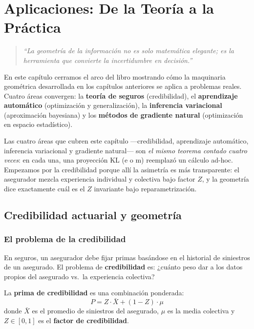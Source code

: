 
\chapter{Aplicaciones: De la Teoría a la Práctica}

\begin{quotation}
	\itshape
	``La geometría de la información no es solo matemática elegante; es la herramienta que convierte la incertidumbre en decisión.''
\end{quotation}

En este capítulo cerramos el arco del libro mostrando cómo la maquinaria geométrica desarrollada en los capítulos anteriores se aplica a problemas reales.  Cuatro áreas convergen: la \textbf{teoría de seguros} (credibilidad), el \textbf{aprendizaje automático} (optimización y generalización), la \textbf{inferencia variacional} (aproximación bayesiana) y los \textbf{métodos de gradiente natural} (optimización en espacio estadístico).

\bigskip
\noindent
Las cuatro áreas que cubren este capítulo ---credibilidad, aprendizaje automático, inferencia variacional y gradiente natural--- son \emph{el mismo teorema contado cuatro veces}: en cada una, una proyección KL (e o m) reemplazó un cálculo ad-hoc. Empezamos por la credibilidad porque allí la asimetría es más transparente: el asegurador mezcla experiencia individual y colectiva bajo factor $Z$, y la geometría dice exactamente cuál es el $Z$ invariante bajo reparametrización.

\section{Credibilidad actuarial y geometría}

\subsection{El problema de la credibilidad}

En seguros, un asegurador debe fijar primas basándose en el historial de siniestros de un asegurado.  El problema de \textbf{credibilidad} es: ¿cuánto peso dar a los datos propios del asegurado vs.\ la experiencia colectiva?

\begin{definition}
	La \textbf{prima de credibilidad} es una combinación ponderada:
	\[
	P = Z \cdot \bar{X} + (1-Z) \cdot \mu
	\]
	donde $\bar{X}$ es el promedio de siniestros del asegurado, $\mu$ es la media colectiva y $Z \in [0,1]$ es el \textbf{factor de credibilidad}.
\end{definition}

